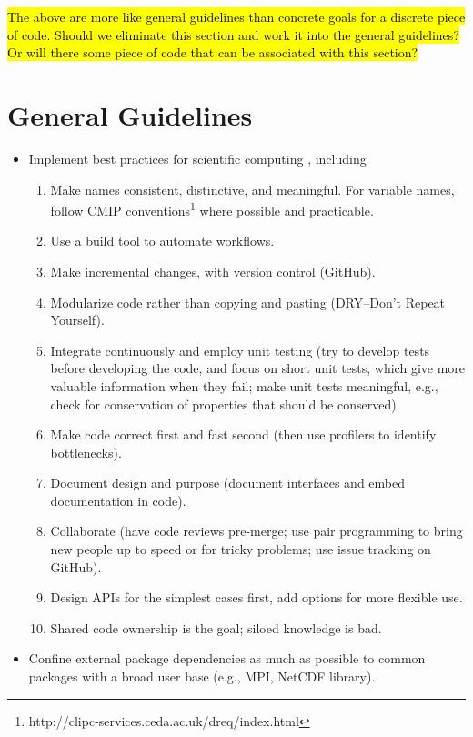 \documentclass{article}
\begin{document}
\hl{The above are more like general guidelines than concrete goals for a discrete piece of code. Should we eliminate this section and work it into the general guidelines? Or will there some piece of code that can be associated with this section?}

\section{General Guidelines}

\begin{itemize}
    \item Implement best practices for scientific computing \citep[e.g.,][]{Wilson14a}, including
        \begin{enumerate}
            \item Make names consistent, distinctive, and meaningful. For variable names, follow CMIP conventions\footnote{http://clipc-services.ceda.ac.uk/dreq/index.html} where possible and practicable.
            \item Use a build tool to automate workflows.
            \item Make incremental changes, with version control (GitHub).
            \item Modularize code rather than copying and pasting (DRY--Don't Repeat Yourself).
            \item Integrate continuously and employ unit testing (try to develop tests before developing the code, and focus on short unit tests, which give more valuable information when they fail; make unit tests meaningful, e.g., check for conservation of properties that should be conserved).
            \item Make code correct first and fast second (then use profilers to identify bottlenecks).
            \item Document design and purpose (document interfaces and embed documentation in code).
            \item Collaborate (have code reviews pre-merge; use pair programming to bring new people up to speed or for tricky problems; use issue tracking on GitHub).
            \item Design APIs for the simplest cases first, add options for more flexible use.
            \item Shared code ownership is the goal; siloed knowledge is bad.
        \end{enumerate}
    \item Confine external package dependencies as much as possible to common packages with a broad user base (e.g., MPI, NetCDF library).

\end{itemize}
\end{document}
